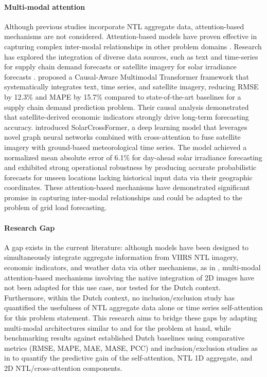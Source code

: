 \paragraph{Multi-modal attention} Although previous studies \cite{borunda_machine_2025,r_forecasting_2025,chen_monthly_2025} incorporate NTL aggregate data, attention-based mechanisms are not considered. Attention-based models have proven effective in capturing complex inter-modal relationships in other problem domains \cite{schubnel_solarcrossformer_2025,wang_causal-aware_2025}. Research has explored the integration of diverse data sources, such as text and time-series for supply chain demand forecasts \cite{wang_causal-aware_2025} or satellite imagery for solar irradiance forecasts \cite{schubnel_solarcrossformer_2025}. \cite{wang_causal-aware_2025} proposed a Causal-Aware Multimodal Transformer framework that systematically integrates text, time series, and satellite imagery, reducing RMSE by 12.3\% and MAPE by 15.7\% compared to state-of-the-art baselines for a supply chain demand prediction problem. Their causal analysis demonstrated that satellite-derived economic indicators strongly drive long-term forecasting accuracy. \cite{schubnel_solarcrossformer_2025} introduced SolarCrossFormer, a deep learning model that leverages novel graph neural networks combined with cross-attention to fuse satellite imagery with ground-based meteorological time series. The model achieved a normalized mean absolute error of 6.1\% for day-ahead solar irradiance forecasting and exhibited strong operational robustness by producing accurate probabilistic forecasts for unseen locations lacking historical input data via their geographic coordinates. These attention-based mechanisms have demonstrated significant promise in capturing inter-modal relationships and could be adapted to the problem of grid load forecasting.

\paragraph{Research Gap} A gap exists in the current literature: although models have been designed to simultaneously integrate aggregate information from VIIRS NTL imagery, economic indicators, and weather data via other mechanisms, as in \cite{chen_monthly_2025,borunda_machine_2025,r_forecasting_2025}, multi-modal attention-based mechanisms involving the native integration of 2D images have not been adapted for this use case, nor tested for the Dutch context. Furthermore, within the Dutch context, no inclusion/exclusion study has quantified the usefulness of NTL aggregate data alone or time series self-attention for this problem statement. This research aims to bridge these gaps by adapting multi-modal architectures similar to \cite{wang_causal-aware_2025} and \cite{schubnel_solarcrossformer_2025} for the problem at hand, while benchmarking results against established Dutch baselines \cite{van_de_sande_enhancing_2024, ashtar_hybrid_2025} using comparative metrics (RMSE, MAPE, MAE, MASE, PCC) and inclusion/exclusion studies as in \cite{wang_causal-aware_2025} to quantify the predictive gain of the self-attention, NTL 1D aggregate, and 2D NTL/cross-attention components.
